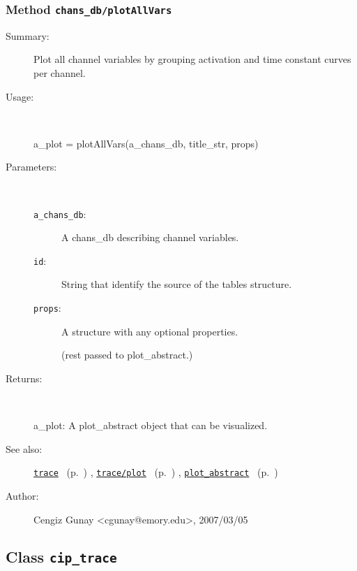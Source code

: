 \subsubsection[Method \texttt{plotAllVars}]{Method \texttt{chans\_db/plotAllVars}}%
%
\label{ref_chans_db__plotAllVars}%
\hypertarget{ref_chans_db__plotAllVars}{}%
\begin{description}
\item[Summary:]Plot all channel variables by grouping activation and time constant curves per channel.
%
\item[Usage:]~%
\begin{lyxcode}%
a\_plot = plotAllVars(a\_chans\_db, title\_str, props)
%
\end{lyxcode}%
%
%
\item[Parameters:]~
\begin{description}%
\item[\texttt{a\_chans\_db}:]
 A chans\_db describing channel variables.
\item[\texttt{id}:]
 String that identify the source of the tables structure.
\item[\texttt{props}:]
 A structure with any optional properties.

(rest passed to plot\_abstract.)\end{description}%
%
\item[Returns:]~

	a\_plot: A plot\_abstract object that can be visualized.
%
%
\item[See also:]%
\hyperlink{ref_trace}{\texttt{trace}}%
\ (p.~\pageref{ref_trace})%
%
, \hyperlink{ref_trace__plot}{\texttt{trace/plot}}%
\ (p.~\pageref{ref_trace__plot})%
%
, \hyperlink{ref_plot_abstract}{\texttt{plot\_abstract}}%
\ (p.~\pageref{ref_plot_abstract})%
%
%
\item[Author:]%
Cengiz Gunay <cgunay@emory.edu>, 2007/03/05%
\end{description}
\methodline%
\subsection{Class \texttt{cip\_trace}}%
%
\label{ref_cip_trace}%
\hypertarget{ref_cip_trace}{}%

